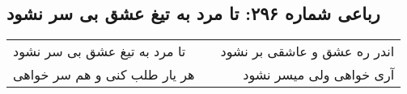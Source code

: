 \begin{center}
\section*{رباعی شماره ۲۹۶: تا مرد به تیغ عشق بی سر نشود}
\label{sec:sh296}
\begin{longtable}{l p{0.5cm} r}
تا مرد به تیغ عشق بی سر نشود
&&
اندر ره عشق و عاشقی بر نشود
\\
هر یار طلب کنی و هم سر خواهی
&&
آری خواهی ولی میسر نشود
\\
\end{longtable}
\end{center}
